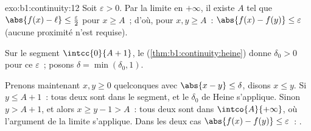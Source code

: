 \begin{solution}{exo:b1:continuity:12}
Soit $\varepsilon > 0$. Par la limite en $+\infty$, il existe $A$ tel
que $\abs{f(x) - \ell} \leq \frac\varepsilon2$ pour $x \geq A$~; d'où,
pour $x, y \geq A$~: $\abs{f(x) - f(y)} \leq \varepsilon$ (aucune
proximité n'est requise).

Sur le segment $\intcc{0}{A + 1}$, le 
(\cref{thm:b1:continuity:heine}) donne $\delta_0 > 0$ pour ce
$\varepsilon$~; posons $\delta = \min(\delta_0, 1)$.

Prenons maintenant $x, y \geq 0$ quelconques avec $\abs{x - y} \leq
\delta$, disons $x \leq y$. Si $y \leq A + 1$~: tous deux sont dans le
segment, et le $\delta_0$ de Heine s'applique. Sinon $y > A + 1$, et
alors $x \geq y - 1 > A$~: tous deux sont dans $\intco{A}{+\infty}$, où
l'argument de la limite s'applique. Dans les deux cas $\abs{f(x) -
f(y)} \leq \varepsilon$~: .
\end{solution}

